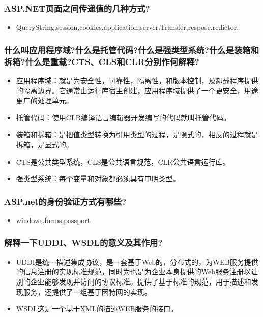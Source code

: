 \documentclass[9pt, b5paper]{article}
\begin{document}
\subsubsection{ASP.NET页面之间传递值的几种方式?}
\label{sec-1-2-82}
\begin{itemize}
\item QueryString,session,cookies,application,server.Transfer,respose.redictor.
\end{itemize}
\subsubsection{什么叫应用程序域?什么是托管代码?什么是强类型系统?什么是装箱和拆箱?什么是重载?CTS、CLS和CLR分别作何解释?}
\label{sec-1-2-83}
\begin{itemize}
\item 应用程序域：就是为安全性，可靠性，隔离性，和版本控制，及卸载程序提供的隔离边界。它通常由运行库宿主创建，应用程序域提供了一个更安全，用途更广的处理单元。
\item 托管代码：使用CLR编译语言编辑器开发编写的代码就叫托管代码。
\item 装箱和拆箱：是把值类型转换为引用类型的过程，是隐式的，相反的过程就是拆箱，是显式的。
\item CTS是公共类型系统，CLS是公共语言规范，CLR公共语言运行库。
\item 强类型系统：每个变量和对象都必须具有申明类型。
\end{itemize}
\subsubsection{ASP.net的身份验证方式有哪些?}
\label{sec-1-2-84}
\begin{itemize}
\item windows,forms,passport
\end{itemize}
\subsubsection{解释一下UDDI、WSDL的意义及其作用?}
\label{sec-1-2-85}
\begin{itemize}
\item UDDI是统一描述集成协议，是一套基于Web的，分布式的，为WEB服务提供的信息注册的实现标准规范，同时为也是为企业本身提供的Web服务注册以让别的企业能够发现并访问的协议标准。提供了基于标准的规范，用于描述和发现服务，还提供了一组基于因特网的实现。
\item WSDL这是一个基于XML的描述WEB服务的接口。
\end{itemize}
\end{document}
